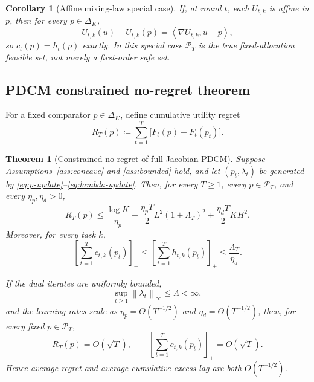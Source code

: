\documentclass[11pt]{article}
\newtheorem{theorem}{Theorem}
\newtheorem{corollary}{Corollary}
\newcommand{\DeltaK}{\Delta_K}
\newcommand{\pos}[1]{\left[#1\right]_+}
\newcommand{\ip}[2]{\left\langle #1,#2\right\rangle}
\newcommand{\norm}[1]{\left\lVert #1\right\rVert}
\begin{document}
\begin{corollary}[Affine mixing-law special case]
\label{cor:affine}
If, at round $t$, each $U_{t,k}$ is affine in $p$, then for every $p\in\DeltaK$,
\begin{equation}
    U_{t,k}(u)-U_{t,k}(p)
    =
    \ip{\nabla U_{t,k}}{u-p},
\end{equation}
so $c_t(p)=h_t(p)$ exactly. In this special case $\mathcal P_T$ is the true fixed-allocation feasible set, not merely a first-order safe set.
\end{corollary}

\subsection{PDCM constrained no-regret theorem}

For a fixed comparator $p\in\DeltaK$, define cumulative utility regret
\begin{equation}
    R_T(p)
    \coloneqq
    \sum_{t=1}^T\bigl[F_t(p)-F_t(p_t)\bigr].
    \label{eq:regret}
\end{equation}

\begin{theorem}[Constrained no-regret of full-Jacobian PDCM]
\label{thm:main}
Suppose Assumptions~\ref{ass:concave} and \ref{ass:bounded} hold, and let $(p_t,\lambda_t)$ be generated by \eqref{eq:p-update}--\eqref{eq:lambda-update}. Then, for every $T\ge1$, every $p\in\mathcal P_T$, and every $\eta_p,\eta_d>0$,
\begin{equation}
    R_T(p)
    \le
    \frac{\log K}{\eta_p}
    +\frac{\eta_p T}{2}L^2(1+\Lambda_T)^2
    +\frac{\eta_d T}{2}KH^2.
    \label{eq:regret-bound}
\end{equation}
Moreover, for every task $k$,
\begin{equation}
    \pos{\sum_{t=1}^T c_{t,k}(p_t)}
    \le
    \pos{\sum_{t=1}^T h_{t,k}(p_t)}
    \le
    \frac{\Lambda_T}{\eta_d}.
    \label{eq:constraint-bound}
\end{equation}

If the dual iterates are uniformly bounded,
\begin{equation}
    \sup_{t\ge1}\norm{\lambda_t}_\infty\le\Lambda<\infty,
    \label{eq:dual-stability}
\end{equation}
and the learning rates scale as $\eta_p=\Theta(T^{-1/2})$ and $\eta_d=\Theta(T^{-1/2})$, then, for every fixed $p\in\mathcal P_T$,
\begin{equation}
    R_T(p)=O(\sqrt T),
    \qquad
    \pos{\sum_{t=1}^T c_{t,k}(p_t)}=O(\sqrt T).
    \label{eq:rates}
\end{equation}
Hence average regret and average cumulative excess lag are both $O(T^{-1/2})$.
\end{theorem}
\end{document}
